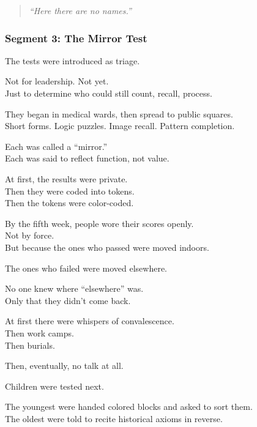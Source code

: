 \documentclass[9pt]{article}
\begin{document}
\begin{quote}
\textit{“Here there are no names.”}
\end{quote}

\newpage

\subsubsection*{Segment 3: The Mirror Test}

The tests were introduced as triage.

Not for leadership. Not yet.\\
Just to determine who could still count, recall, process.

They began in medical wards, then spread to public squares.\\
Short forms. Logic puzzles. Image recall. Pattern completion.

Each was called a “mirror.”\\
Each was said to reflect function, not value.

\vspace{1em}

At first, the results were private.\\
Then they were coded into tokens.\\
Then the tokens were color-coded.

By the fifth week, people wore their scores openly.\\
Not by force.\\
But because the ones who passed were moved indoors.

The ones who failed were moved elsewhere.

\vspace{1em}

No one knew where “elsewhere” was.\\
Only that they didn’t come back.

At first there were whispers of convalescence.\\
Then work camps.\\
Then burials.

Then, eventually, no talk at all.

\vspace{1em}

Children were tested next.

The youngest were handed colored blocks and asked to sort them.\\
The oldest were told to recite historical axioms in reverse.
\end{document}
